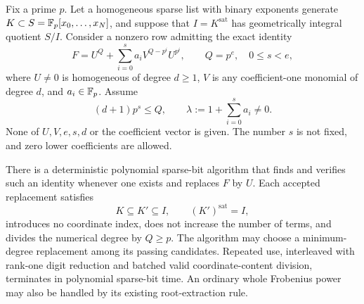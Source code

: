 \begin{theorem}
\label{sp:thm:linearized-preprocessing}
Fix a prime $p$. Let a homogeneous sparse list with binary exponents
generate $K\subset S=\mathbb F_p[x_0,\ldots,x_N]$, and suppose that
$I=K^{\mathrm{sat}}$ has geometrically integral quotient $S/I$.
Consider a nonzero row admitting the exact identity
\begin{equation}
 F=U^Q+\sum_{i=0}^{s}a_iV^{Q-p^i}U^{p^i},
 \qquad Q=p^e,\quad 0\le s<e,
 \label{sp:eq:linearized-relation}
\end{equation}
where $U\ne0$ is homogeneous of degree $d\ge1$, $V$ is any
coefficient-one monomial of degree $d$, and $a_i\in\mathbb F_p$. Assume
\begin{equation}
 (d+1)p^s\le Q,\qquad
 \lambda:=1+\sum_{i=0}^{s}a_i\ne0.
 \label{sp:eq:linearized-gap}
\end{equation}
None of $U,V,e,s,d$ or the coefficient vector is given. The number
$s$ is not fixed, and zero lower coefficients are allowed.

There is a deterministic polynomial sparse-bit algorithm that finds
and verifies such an identity whenever one exists and replaces $F$
by $U$. Each accepted replacement satisfies
\[
 K\subseteq K'\subseteq I,\qquad (K')^{\mathrm{sat}}=I,
\]
introduces no coordinate index, does not increase the number of
terms, and divides the numerical degree by $Q\ge p$.
The algorithm may choose a minimum-degree replacement among its
passing candidates. Repeated use, interleaved with rank-one digit
reduction and batched valid coordinate-content division, terminates
in polynomial sparse-bit time. An ordinary whole Frobenius power
may also be handled by its existing root-extraction rule.
\end{theorem}
